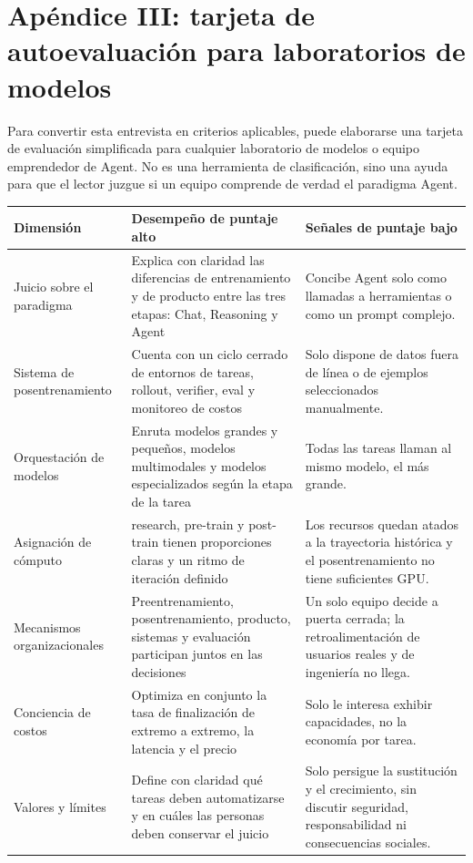\section{Apéndice III: tarjeta de autoevaluación para laboratorios de modelos}

Para convertir esta entrevista en criterios aplicables, puede elaborarse una tarjeta de evaluación simplificada para cualquier laboratorio de modelos o equipo emprendedor de Agent. No es una herramienta de clasificación, sino una ayuda para que el lector juzgue si un equipo comprende de verdad el paradigma Agent.

\noindent\begin{longtable}{p{}p{}p{}}
\toprule
Dimensión & Desempeño de puntaje alto & Señales de puntaje bajo \\
\midrule
Juicio sobre el paradigma & Explica con claridad las diferencias de entrenamiento y de producto entre las tres etapas: Chat, Reasoning y Agent & Concibe Agent solo como llamadas a herramientas o como un prompt complejo. \\
Sistema de posentrenamiento & Cuenta con un ciclo cerrado de entornos de tareas, rollout, verifier, eval y monitoreo de costos & Solo dispone de datos fuera de línea o de ejemplos seleccionados manualmente. \\
Orquestación de modelos & Enruta modelos grandes y pequeños, modelos multimodales y modelos especializados según la etapa de la tarea & Todas las tareas llaman al mismo modelo, el más grande. \\
Asignación de cómputo & research, pre-train y post-train tienen proporciones claras y un ritmo de iteración definido & Los recursos quedan atados a la trayectoria histórica y el posentrenamiento no tiene suficientes GPU. \\
Mecanismos organizacionales & Preentrenamiento, posentrenamiento, producto, sistemas y evaluación participan juntos en las decisiones & Un solo equipo decide a puerta cerrada; la retroalimentación de usuarios reales y de ingeniería no llega. \\
Conciencia de costos & Optimiza en conjunto la tasa de finalización de extremo a extremo, la latencia y el precio & Solo le interesa exhibir capacidades, no la economía por tarea. \\
Valores y límites & Define con claridad qué tareas deben automatizarse y en cuáles las personas deben conservar el juicio & Solo persigue la sustitución y el crecimiento, sin discutir seguridad, responsabilidad ni consecuencias sociales. \\
\bottomrule
\end{longtable}


